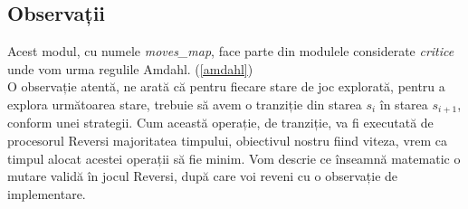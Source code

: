 \documentclass[12pt,twoside,a4paper,fleqn]{book}
\theoremstyle{definition}
\begin{document}
\subsection{Observații}
Acest modul, cu numele \emph{moves\_map}, face parte din modulele considerate \emph{critice} unde vom urma regulile Amdahl. (\ref{amdahl})\\
O observație atentă, ne arată că pentru fiecare stare de joc explorată, pentru a explora următoarea stare, trebuie să avem o tranziție din starea $s_{i}$ în starea $s_{i+1}$, conform unei strategii. Cum această operație, de tranziție, va fi executată de procesorul Reversi majoritatea timpului, obiectivul nostru fiind viteza, vrem ca timpul alocat acestei operații să fie minim. Vom descrie ce înseamnă matematic o mutare validă în jocul Reversi, după care voi reveni cu o observație de implementare.
\end{document}
